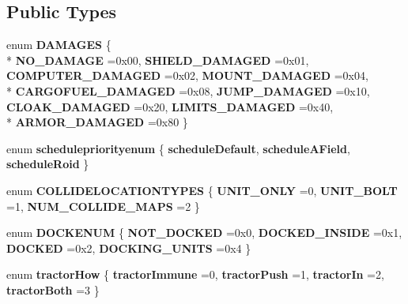 \subsection*{Public Types}
\begin{DoxyCompactItemize}
\item 
enum {\bfseries D\+A\+M\+A\+G\+ES} \{ \\*
{\bfseries N\+O\+\_\+\+D\+A\+M\+A\+GE} =0x00, 
{\bfseries S\+H\+I\+E\+L\+D\+\_\+\+D\+A\+M\+A\+G\+ED} =0x01, 
{\bfseries C\+O\+M\+P\+U\+T\+E\+R\+\_\+\+D\+A\+M\+A\+G\+ED} =0x02, 
{\bfseries M\+O\+U\+N\+T\+\_\+\+D\+A\+M\+A\+G\+ED} =0x04, 
\\*
{\bfseries C\+A\+R\+G\+O\+F\+U\+E\+L\+\_\+\+D\+A\+M\+A\+G\+ED} =0x08, 
{\bfseries J\+U\+M\+P\+\_\+\+D\+A\+M\+A\+G\+ED} =0x10, 
{\bfseries C\+L\+O\+A\+K\+\_\+\+D\+A\+M\+A\+G\+ED} =0x20, 
{\bfseries L\+I\+M\+I\+T\+S\+\_\+\+D\+A\+M\+A\+G\+ED} =0x40, 
\\*
{\bfseries A\+R\+M\+O\+R\+\_\+\+D\+A\+M\+A\+G\+ED} =0x80
 \}\hypertarget{classUnit_af077d5012869274f25284a9de7321f04}{}\label{classUnit_af077d5012869274f25284a9de7321f04}

\item 
enum {\bfseries schedulepriorityenum} \{ {\bfseries schedule\+Default}, 
{\bfseries schedule\+A\+Field}, 
{\bfseries schedule\+Roid}
 \}\hypertarget{classUnit_a7da68702f245c1ad6081c15436109c9d}{}\label{classUnit_a7da68702f245c1ad6081c15436109c9d}

\item 
enum {\bfseries C\+O\+L\+L\+I\+D\+E\+L\+O\+C\+A\+T\+I\+O\+N\+T\+Y\+P\+ES} \{ {\bfseries U\+N\+I\+T\+\_\+\+O\+N\+LY} =0, 
{\bfseries U\+N\+I\+T\+\_\+\+B\+O\+LT} =1, 
{\bfseries N\+U\+M\+\_\+\+C\+O\+L\+L\+I\+D\+E\+\_\+\+M\+A\+PS} =2
 \}\hypertarget{classUnit_a11b40339c0d2679c4284228e9053cd49}{}\label{classUnit_a11b40339c0d2679c4284228e9053cd49}

\item 
enum {\bfseries D\+O\+C\+K\+E\+N\+UM} \{ {\bfseries N\+O\+T\+\_\+\+D\+O\+C\+K\+ED} =0x0, 
{\bfseries D\+O\+C\+K\+E\+D\+\_\+\+I\+N\+S\+I\+DE} =0x1, 
{\bfseries D\+O\+C\+K\+ED} =0x2, 
{\bfseries D\+O\+C\+K\+I\+N\+G\+\_\+\+U\+N\+I\+TS} =0x4
 \}\hypertarget{classUnit_a59e351abed6d8d4e4a31485e124e909d}{}\label{classUnit_a59e351abed6d8d4e4a31485e124e909d}

\item 
enum {\bfseries tractor\+How} \{ {\bfseries tractor\+Immune} =0, 
{\bfseries tractor\+Push} =1, 
{\bfseries tractor\+In} =2, 
{\bfseries tractor\+Both} =3
 \}\hypertarget{classUnit_aabda6c3af76d8389df05475c21714095}{}\label{classUnit_aabda6c3af76d8389df05475c21714095}

\end{DoxyCompactItemize}
